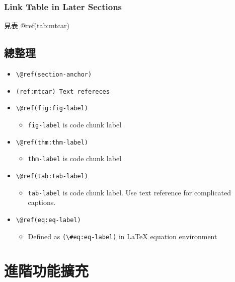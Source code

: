 \documentclass[oneside]{book}
\providecommand{\tightlist}{%
  \setlength{\itemsep}{0pt}\setlength{\parskip}{0pt}}
\begin{document}
\hypertarget{link-table-in-later-sections}{%
\subsection*{Link Table in Later Sections}\label{link-table-in-later-sections}}

見表 @ref(tab:mtcar)

\hypertarget{ux7e3dux6574ux7406}{%
\section{總整理}\label{ux7e3dux6574ux7406}}

\begin{itemize}
\tightlist
\item
  \texttt{\textbackslash{}@ref(section-anchor)}
\item
  \texttt{(ref:mtcar)\ Text\ refereces}
\item
  \texttt{\textbackslash{}@ref(fig:fig-label)}

  \begin{itemize}
  \tightlist
  \item
    \texttt{fig-label} is code chunk label
  \end{itemize}
\item
  \texttt{\textbackslash{}@ref(thm:thm-label)}

  \begin{itemize}
  \tightlist
  \item
    \texttt{thm-label} is code chunk label
  \end{itemize}
\item
  \texttt{\textbackslash{}@ref(tab:tab-label)}

  \begin{itemize}
  \tightlist
  \item
    \texttt{tab-label} is code chunk label. Use text reference for complicated captions.
  \end{itemize}
\item
  \texttt{\textbackslash{}@ref(eq:eq-label)}

  \begin{itemize}
  \tightlist
  \item
    Defined as \texttt{(\textbackslash{}\#eq:eq-label)} in LaTeX equation environment
  \end{itemize}
\end{itemize}

\hypertarget{add-on}{%
\chapter{進階功能擴充}\label{add-on}}
\end{document}
